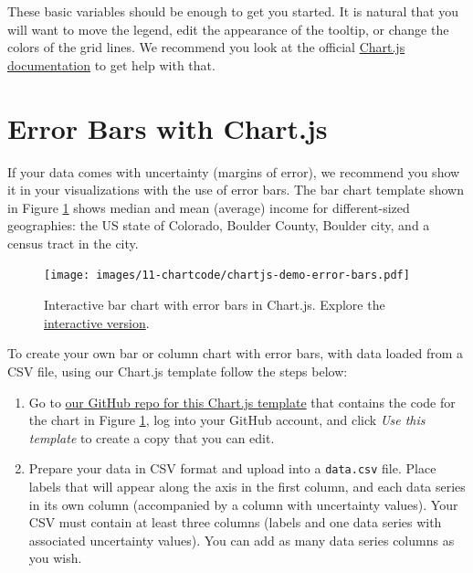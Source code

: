 \documentclass[
  english,
]{book}
\begin{document}
These basic variables should be enough to get you started. It is natural that you will want to move the legend, edit the appearance of the tooltip, or change the colors of the grid lines. We recommend you look at the official \href{https://www.chartjs.org/docs/latest/}{Chart.js documentation} to get help with that.

\hypertarget{chartjs-error-bars}{%
\section*{Error Bars with Chart.js}\label{chartjs-error-bars}}

If your data comes with uncertainty (margins of error), we recommend you show it in your visualizations with the use of error bars. The bar chart template shown in Figure \ref{fig:chartjs-demo-error-bars}
shows median and mean (average) income for different-sized geographies: the US state of Colorado, Boulder County, Boulder city, and a census tract in the city.



\begin{figure}
\centering
\texttt{[image: images/11-chartcode/chartjs-demo-error-bars.pdf]}
\caption{\label{fig:chartjs-demo-error-bars}Interactive bar chart with error bars in Chart.js. Explore the \href{https://handsondataviz.github.io/chartjs-error-bars/index.html}{interactive version}.}
\end{figure}

To create your own bar or column chart with error bars, with data loaded from a CSV file, using our Chart.js template follow the steps below:

\begin{enumerate}
\def\labelenumi{\arabic{enumi}.}
\item
  Go to \href{https://github.com/HandsOnDataViz/chartjs-error-bars}{our GitHub repo for this Chart.js template} that contains the code for the chart in Figure \ref{fig:chartjs-demo-error-bars}, log into your GitHub account, and click \emph{Use this template} to create a copy that you can edit.
\item
  Prepare your data in CSV format and upload into a \texttt{data.csv} file. Place labels that will appear along the axis in the first column, and each data series in its own column (accompanied by a column with uncertainty values). Your CSV must contain at least three columns (labels and one data series with associated uncertainty values). You can add as many data series columns as you wish.
\end{enumerate}
\end{document}
